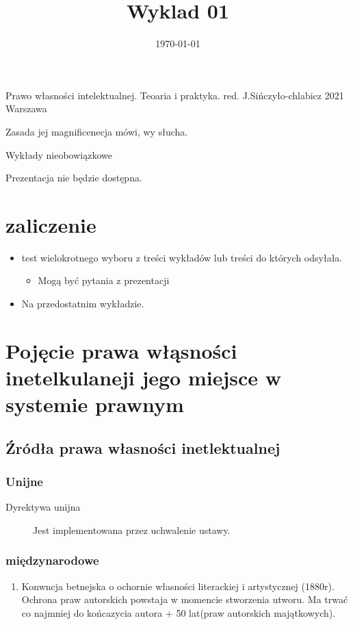 \documentclass[11pt]{article}
\date{\today}
\title{Wyklad 01}
\begin{document}
\maketitle
\tableofcontents

\begin{description}
\item[{Podręcznik}] Prawo własności intelektualnej. Teoaria i praktyka. red. J.Sińczyło-chlabicz 2021 Warszawa
\item[{Pytania na koniec}] Zasada jej magnificenecja mówi, wy słucha.
\item Wykłady nieobowiązkowe
\item Prezentacja nie będzie dostępna.
\end{description}
\section{zaliczenie}
\label{sec:org543ef5b}
\begin{itemize}
\item test wielokrotnego wyboru z treści wykładów lub treści do których odsyłała.
\begin{itemize}
\item Mogą być pytania z prezentacji
\end{itemize}
\item Na przedostatnim wykładzie.
\end{itemize}
\section{Pojęcie prawa włąsności inetelkulaneji jego miejsce w systemie prawnym}
\label{sec:org3c6efc2}
\subsection{Źródła prawa własności inetlektualnej}
\label{sec:org54fea43}
\subsubsection{Unijne}
\label{sec:orgfd9bdf4}
\begin{description}
\item[{Dyrektywa unijna}] Jest implementowana przez uchwalenie ustawy.
\end{description}
\subsubsection{międzynarodowe}
\label{sec:orgcab6f27}
\begin{enumerate}
\item Konwncja betnejska o ochornie własności literackiej i artystycznej (1880r).
\label{sec:orgf8115f6}
Ochrona praw autorskich powstaja w momencie stworzenia utworu. Ma trwać co najmniej do końcazycia autora + 50 lat(praw autorskich majątkowych).
\end{enumerate}
\end{document}

